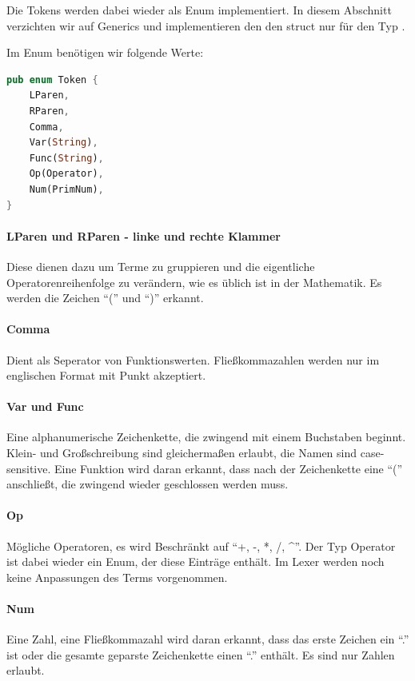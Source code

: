 \documentclass[11pt,a4paper, ngerman]{article}
\begin{document}
Die Tokens werden dabei wieder als Enum implementiert. In diesem Abschnitt verzichten wir auf Generics und implementieren den den struct nur für den Typ .

Im Enum benötigen wir folgende Werte:
\begin{lstlisting}[language=rust, caption={Enum Token}]
pub enum Token {
    LParen,
    RParen,
    Comma,
    Var(String),
    Func(String),
    Op(Operator),
    Num(PrimNum),
}
\end{lstlisting}

\paragraph{LParen und RParen - linke und rechte Klammer} Diese dienen dazu um Terme zu gruppieren und die eigentliche Operatorenreihenfolge zu verändern, wie es üblich ist in der Mathematik. Es werden die Zeichen ``('' und ``)'' erkannt.

\paragraph{Comma} Dient als Seperator von Funktionswerten. Fließkommazahlen werden nur im englischen Format mit Punkt akzeptiert.

\paragraph{Var und Func} Eine alphanumerische Zeichenkette, die zwingend mit einem Buchstaben beginnt. Klein- und Großschreibung sind gleichermaßen erlaubt, die Namen sind case-sensitive. Eine Funktion wird daran erkannt, dass nach der Zeichenkette eine ``('' anschließt, die zwingend wieder geschlossen werden muss.

\paragraph{Op} Mögliche Operatoren, es wird Beschränkt auf ``+, -, *, /, \^{}''. Der Typ Operator ist dabei wieder ein Enum, der diese Einträge enthält. Im Lexer werden noch keine Anpassungen des Terms vorgenommen.

\paragraph{Num} Eine Zahl, eine Fließkommazahl wird daran erkannt, dass das erste Zeichen ein ``.'' ist oder die gesamte geparste Zeichenkette einen ``.'' enthält. Es sind nur Zahlen erlaubt.
\end{document}
